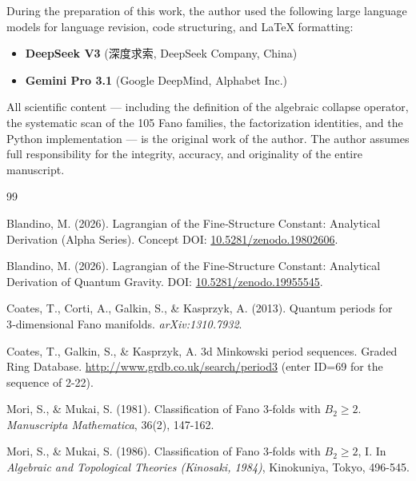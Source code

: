 \documentclass[12pt]{article}
\begin{document}
During the preparation of this work, the author used the following large
language models for language revision, code structuring, and LaTeX formatting:
\begin{itemize}
  \item \textbf{DeepSeek V3} (深度求索, DeepSeek Company, China)
  \item \textbf{Gemini Pro 3.1} (Google DeepMind, Alphabet Inc.)
\end{itemize}
All scientific content — including the definition of the algebraic collapse
operator, the systematic scan of the 105 Fano families, the factorization
identities, and the Python implementation — is the original work of the author.
The author assumes full responsibility for the integrity, accuracy, and
originality of the entire manuscript.


\begin{thebibliography}{99}

Blandino, M. (2026). Lagrangian of the Fine‑Structure Constant:
Analytical Derivation (Alpha Series).
Concept DOI: \href{https://doi.org/10.5281/zenodo.19802606}{10.5281/zenodo.19802606}.

Blandino, M. (2026). Lagrangian of the Fine‑Structure Constant:
Analytical Derivation of Quantum Gravity.
DOI: \href{https://doi.org/10.5281/zenodo.19955545}{10.5281/zenodo.19955545}.

Coates, T., Corti, A., Galkin, S., \& Kasprzyk, A. (2013).
Quantum periods for 3‑dimensional Fano manifolds.
\textit{arXiv:1310.7932}.

Coates, T., Galkin, S., \& Kasprzyk, A.
3d Minkowski period sequences.
Graded Ring Database.
\url{http://www.grdb.co.uk/search/period3}
(enter ID=69 for the sequence of 2-22).

Mori, S., \& Mukai, S. (1981).
Classification of Fano 3‑folds with \(B_2 \ge 2\).
\textit{Manuscripta Mathematica}, 36(2), 147-162.

Mori, S., \& Mukai, S. (1986).
Classification of Fano 3‑folds with \(B_2 \ge 2\), I.
In \textit{Algebraic and Topological Theories (Kinosaki, 1984)}, Kinokuniya, Tokyo, 496-545.

\end{thebibliography}
\end{document}
